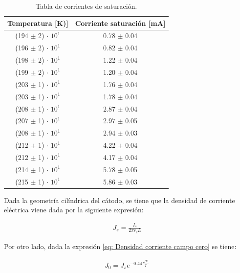 \documentclass[%
 reprint,
 amsmath,amssymb,
 aps,
]{revtex4-2}
\begin{document}
\begin{table}[H]
    \centering
    \begin{tabular}{c|c}
        \toprule
        \toprule
        Temperatura [K)]& Corriente saturación [mA]\\
        \midrule
        (194 $\pm$ 2) $\cdot$ $10^{1}$  &  0.78 $\pm$ 0.04 \\
        (196 $\pm$ 2) $\cdot$ $10^{1}$  &  0.82 $\pm$ 0.04 \\
        (198 $\pm$ 2) $\cdot$ $10^{1}$  &  1.22 $\pm$ 0.04 \\
        (199 $\pm$ 2) $\cdot$ $10^{1}$  &  1.20 $\pm$ 0.04 \\
        (203 $\pm$ 1) $\cdot$ $10^{1}$  &  1.76 $\pm$ 0.04 \\
        (203 $\pm$ 1) $\cdot$ $10^{1}$ &  1.78 $\pm$ 0.04 \\
        (208 $\pm$ 1) $\cdot$ $10^{1}$  &  2.87 $\pm$ 0.04 \\
        (207 $\pm$ 1) $\cdot$ $10^{1}$  &  2.97 $\pm$ 0.05 \\
        (208 $\pm$ 1) $\cdot$ $10^{1}$  &  2.94 $\pm$ 0.03 \\
        (212 $\pm$ 1) $\cdot$ $10^{1}$  &  4.22 $\pm$ 0.04 \\
        (212 $\pm$ 1) $\cdot$ $10^{1}$  &  4.17 $\pm$ 0.04 \\
        (214 $\pm$ 1) $\cdot$ $10^{1}$  &  5.78 $\pm$ 0.05 \\
        (215 $\pm$ 1) $\cdot$ $10^{1}$  &  5.86 $\pm$ 0.03 \\

        \bottomrule
        \bottomrule

    \end{tabular}
    \caption{Tabla de corrientes de saturación.}
    \label{tab: Corrientes de saturacion}
\end{table}

\vspace{0.2 cm}
Dada la geometría cilíndrica del cátodo, se tiene que la densidad de corriente eléctrica viene dada por la siguiente expresión:

\begin{align*}
    J_{s}= \frac{I_{s}}{2\pi r_{c}L}
\end{align*}

\vspace{0.2 cm}
Por otro lado, dada la expresión \ref{eq: Densidad corriente campo cero} se tiene:

\begin{align*}
    J_{0} = J_{s}e^{-0.44\frac{\sqrt{E}}{T}}
\end{align*}
\end{document}
